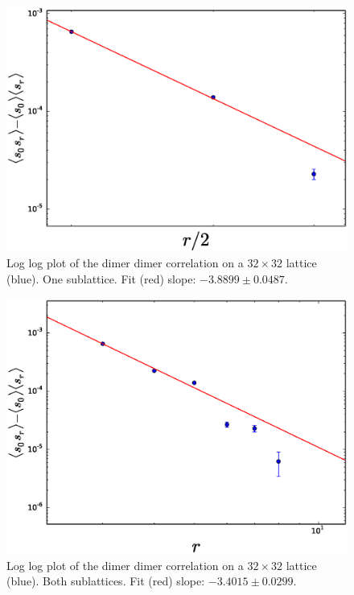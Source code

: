 \documentclass[aps,floatfix,11pt]{revtex4-1}
\begin{document}
\begin{figure}[h]
    \centering
    \includegraphics[width=8.5 cm]{s_dimer_dimer_cor_loglog_one_sublat_32x32}
    \caption{Log log plot of the dimer dimer correlation on a $32\times32$ lattice (blue). 
        One sublattice. Fit (red) slope: $-3.8899 \pm 0.0487$.
    \label{fig:s_dimer_dimer_log}}
\end{figure}

\begin{figure}[h]
    \centering
    \includegraphics[width=8.5 cm]{s_dimer_dimer_cor_loglog_both_sublat_32x32}
    \caption{Log log plot of the dimer dimer correlation on a $32\times32$ lattice (blue). 
        Both sublattices. Fit (red) slope: $-3.4015 \pm 0.0299$.
    \label{fig:s_dimer_dimer_log}}
\end{figure}
\end{document}
